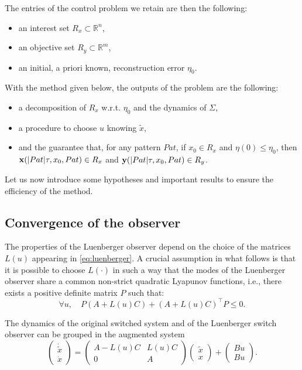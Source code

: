 The entries of the control problem we retain are then the following:
\begin{itemize}
 \item an interest set $R_x \subset \mathbb{R}^n$,
 \item an objective set $R_y \subset \mathbb{R}^m$,
 \item an initial, a priori known, reconstruction error $\eta_0$.
\end{itemize}

With the method given below, the 
outputs of the problem are the following:
\begin{itemize}
  \item a decomposition of $R_x$ w.r.t. $\eta_0$ and the dynamics of $\Sigma$,
  \item a procedure to  choose $u$ knowing $\tilde x$,
  \item and the guarantee that, for any pattern $Pat$, if $x_0 \in R_x$ and $\eta(0) \leq \eta_0$, then \newline 
  $ {\bf x}(\vert Pat \vert \tau,x_0,Pat) \in R_x$ and
  ${\bf y}(\vert Pat \vert \tau,x_0,Pat) \in R_y$.
 \end{itemize}

Let us now introduce some hypotheses and important results to ensure the 
efficiency of the method.


\subsection{Convergence of the observer}


The properties of the  Luenberger observer  depend on the choice of the 
matrices $L(u)$ appearing in \eqref{eq:luenberger}. 
A crucial assumption in what follows is that 
it is possible to choose $L(\cdot)$ in such a way that
the modes of the Luenberger observer 
share a common non-strict quadratic Lyapunov functions, i.e., there exists 
a positive definite matrix $P$ such that:
\begin{equation}\label{w-Lyapunov}
\forall u, \quad P (A + L(u)C) + (A + L(u)C)^\top P \leq 0.
\end{equation}


The dynamics of the original switched system and of the Luenberger switch observer
can be grouped in the  augmented system
\[
\left(
\begin{array}{l}
\dot{\tilde x } \\
 \dot x
\end{array} \right) = 
\left( \begin{matrix}
A-L(u)C & L(u)C \\
 0 & A
\end{matrix} \right) \left( \begin{array}{l}
                            \tilde x \\ x 
                           \end{array} \right)
                            + \left( \begin{array}{l}
                               Bu \\ Bu
                              \end{array} \right).
\]

